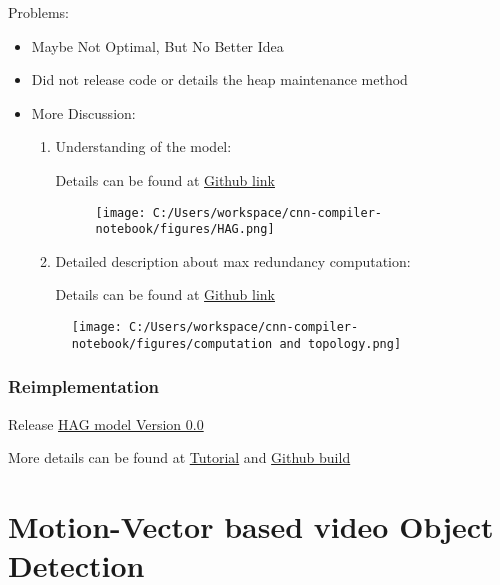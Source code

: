 \documentclass[]{article}
\begin{document}
Problems:

\begin{itemize}
\item
  Maybe Not Optimal, But No Better Idea
\item
  Did not release code or details the heap maintenance method
\item
  More Discussion:

  \begin{enumerate}
  \def\labelenumi{\arabic{enumi}.}
  \item
    Understanding of the model:

    Details can be found at
    \href{https://github.com/OrdinaryCrazy/cnn-compiler-notebook/blob/master/weekly-report/weeklyreport0722-0728.pdf}{Github
    link}

    \begin{figure}
    \centering
    \texttt{[image: C:/Users/workspace/cnn-compiler-notebook/figures/HAG.png]}
    \caption{}
    \end{figure}
  \item
    Detailed description about max redundancy computation:

    Details can be found at
    \href{https://github.com/OrdinaryCrazy/cnn-compiler-notebook/blob/master/weekly-report/weeklyreport0729-0804.pdf}{Github
    link}
  \end{enumerate}

  \begin{figure}
  \centering
  \texttt{[image: C:/Users/workspace/cnn-compiler-notebook/figures/computation and topology.png]}
  \caption{}
  \end{figure}
\end{itemize}

\hypertarget{header-n1870}{%
\subsubsection{Reimplementation}\label{header-n1870}}

Release
\href{https://github.com/OrdinaryCrazy/cnn-compiler-notebook/blob/master/GNN-jupyter-code/HAG.py}{HAG
model Version 0.0}

More details can be found at
\href{https://github.com/OrdinaryCrazy/cnn-compiler-notebook/blob/master/weekly-report/weeklyreport0729-0804.pdf}{Tutorial}
and
\href{https://github.com/OrdinaryCrazy/cnn-compiler-notebook/tree/master/HAG}{Github
build}

\hypertarget{header-n1873}{%
\section{Motion-Vector based video Object
Detection}\label{header-n1873}}
\end{document}
